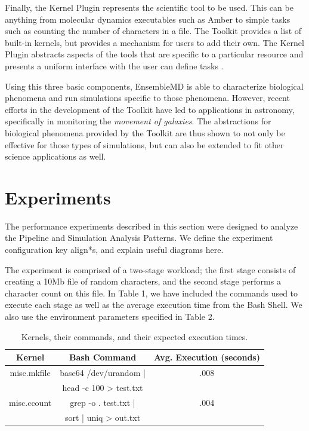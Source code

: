 \documentclass[]{article}
\begin{document}
			Finally, the Kernel Plugin represents the scientific tool to be used. This can be anything from molecular dynamics executables such as Amber to simple tasks such as counting the number of characters in a file. The Toolkit provides a list of built-in kernels, but provides a mechanism for users to add their own. The Kernel Plugin abstracts aspects of the tools that are specific to a particular resource and presents a uniform interface with the user can define tasks \cite{enmd_paper}.

			Using this three basic components, EnsembleMD is able to characterize biological phenomena and run simulations specific to those phenomena. However, recent efforts in the development of the Toolkit have led to applications in astronomy, specifically in monitoring the \textit{movement of galaxies}. The abstractions for biological phenomena provided by the Toolkit are thus shown to not only be effective for those types of simulations, but can also be extended to fit other science applications as well.

\section{Experiments}
		The performance experiments described in this section were designed to analyze the Pipeline and Simulation Analysis Patterns. We define the experiment configuration key align*s, and explain useful diagrams here.

		The experiment is comprised of a two-stage workload; the first stage consists of creating a 10Mb file of random characters, and the second stage performs a character count on this file. In Table 1, we have included the commands used to execute each stage as well as the average execution time from the Bash Shell. We also use the environment parameters specified in Table 2.

		\begin{table}[H]
			\centering
			\begin{tabu}{|c|c|c|}
				\hline
				Kernel & Bash Command & Avg. Execution (seconds) \\
				\hline
				misc.mkfile & base64 /dev/urandom | & .008 \\ 
							& head -c 100 > test.txt  \\
				\hline
				misc.ccount & grep -o . test.txt |  & .004\\ 
							& sort | uniq > out.txt   \\
				\hline
			\end{tabu}
			\caption{Kernels, their commands, and their expected execution times.}
			\label{table:kernel_execution_table}
		\end{table}
\end{document}
